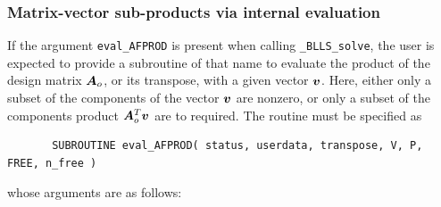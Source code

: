 \documentclass{galahad}
\newcommand{\packagename}{BLLS}
\newcommand{\fullpackagename}{\libraryname\_\packagename}
\newcommand{\solver}{{\tt \fullpackagename\_solve}}
\begin{document}

\subsubsection{Matrix-vector sub-products via internal evaluation\label{jvsp}}

If the argument {\tt eval\_AFPROD} is present when calling \solver, the
user is expected to provide a subroutine of that name to evaluate the
product of the design matrix ${\bm{A}}_o$, or its transpose, 
with a given vector ${\bm{v}}$.
Here, either only a subset of the components of the vector ${\bm{v}}$ are nonzero,
or only a subset of the components product ${\bm{A}}_o^T {\bm{v}}$ are to required.
The routine must be specified as

\def\baselinestretch{0.8}
{\tt \begin{verbatim}
       SUBROUTINE eval_AFPROD( status, userdata, transpose, V, P, FREE, n_free )
\end{verbatim} }
\def\baselinestretch{1.0}
\noindent whose arguments are as follows:
\end{document}

